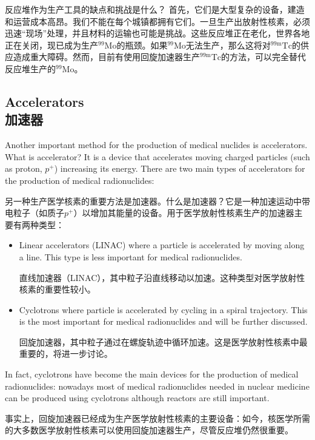 \documentclass[dvipsnames, svgnames,a4paper,11pt]{article}
\begin{document}
反应堆作为生产工具的缺点和挑战是什么？
首先，它们是大型复杂的设备，建造和运营成本高昂。我们不能在每个城镇都拥有它们。一旦生产出放射性核素，必须迅速“现场”处理，并且材料的运输也可能是挑战。这些反应堆正在老化，世界各地正在关闭，现已成为生产${}^\text{99}\text{Mo}$的瓶颈。如果${}^\text{99}\text{Mo}$无法生产，那么这将对${}^\text{99m}\text{Tc}$的供应造成重大障碍。然而，目前有使用回旋加速器生产${}^\text{99m}\text{Tc}$的方法，可以完全替代反应堆生产的${}^\text{99}\text{Mo}$。


\subsection{Accelerators\\加速器}

Another important method for the production of medical nuclides is accelerators. What is accelerator? It is a device that accelerates moving charged particles (such as proton, $p^+$) increasing its energy. There are two main types of accelerators for the production of medical radionuclides:

另一种生产医学核素的重要方法是加速器。什么是加速器？它是一种加速运动中带电粒子（如质子$p^+$）以增加其能量的设备。用于医学放射性核素生产的加速器主要有两种类型：

\begin{itemize}
\item Linear accelerators (LINAC) where a particle is accelerated by moving along a line. This type is less important for medical radionuclides.  
      
直线加速器（LINAC），其中粒子沿直线移动以加速。这种类型对医学放射性核素的重要性较小。  

\item Cyclotrons where particle is accelerated by cycling in a spiral trajectory. This is the most important for medical radionuclides and will be further discussed.
      
回旋加速器，其中粒子通过在螺旋轨迹中循环加速。这是医学放射性核素中最重要的，将进一步讨论。

\end{itemize}

In fact, cyclotrons have become the main devices for the production of medical radionuclides: nowadays most of medical radionuclides needed in nuclear medicine can be produced using cyclotrons although reactors are still important.

事实上，回旋加速器已经成为生产医学放射性核素的主要设备：如今，核医学所需的大多数医学放射性核素可以使用回旋加速器生产，尽管反应堆仍然很重要。
\end{document}
